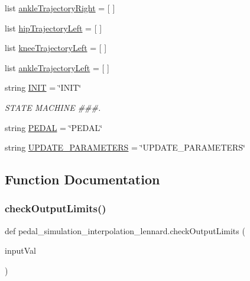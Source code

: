 \begin{DoxyCompactItemize}
list \mbox{\hyperlink{namespacepedal__simulation__interpolation__lennard_a78928fe682f1e515ec45deeb4691928f}{ankle\+Trajectory\+Right}} = \mbox{[} \mbox{]}
\item 
list \mbox{\hyperlink{namespacepedal__simulation__interpolation__lennard_a5319405a7f9f155312814a5b5758ea28}{hip\+Trajectory\+Left}} = \mbox{[} \mbox{]}
\item 
list \mbox{\hyperlink{namespacepedal__simulation__interpolation__lennard_a9b3efef6ba899c56876e3f20fbd596c4}{knee\+Trajectory\+Left}} = \mbox{[} \mbox{]}
\item 
list \mbox{\hyperlink{namespacepedal__simulation__interpolation__lennard_afedbe6dd4858c559f464442060f5f766}{ankle\+Trajectory\+Left}} = \mbox{[} \mbox{]}
\item 
string \mbox{\hyperlink{namespacepedal__simulation__interpolation__lennard_a65ee179bf86f324aa779355bff78281d}{I\+N\+IT}} = \char`\"{}I\+N\+IT\char`\"{}
\begin{DoxyCompactList}\small\item\em S\+T\+A\+TE M\+A\+C\+H\+I\+NE \#\#\#. \end{DoxyCompactList}\item 
string \mbox{\hyperlink{namespacepedal__simulation__interpolation__lennard_aa779b19e64f42179ee02615ce7e2bb1a}{P\+E\+D\+AL}} = \char`\"{}P\+E\+D\+AL\char`\"{}
\item 
string \mbox{\hyperlink{namespacepedal__simulation__interpolation__lennard_af25e19966b8c972edbc5b2ae6db79a91}{U\+P\+D\+A\+T\+E\+\_\+\+P\+A\+R\+A\+M\+E\+T\+E\+RS}} = \char`\"{}U\+P\+D\+A\+T\+E\+\_\+\+P\+A\+R\+A\+M\+E\+T\+E\+RS\char`\"{}
\end{DoxyCompactItemize}


\subsection{Function Documentation}
\mbox{\label{namespacepedal__simulation__interpolation__lennard_a19e0927e352a6dc42f4e6d5354085257}} 
\subsubsection{\texorpdfstring{checkOutputLimits()}{checkOutputLimits()}}
{\footnotesize\ttfamily def pedal\+\_\+simulation\+\_\+interpolation\+\_\+lennard.\+check\+Output\+Limits (\begin{DoxyParamCaption}\item[{}]{input\+Val }\end{DoxyParamCaption})}



